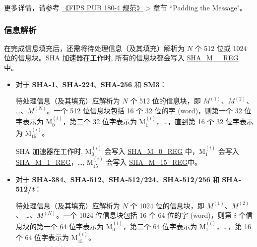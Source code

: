 \documentclass[main\_\_CN.tex]{subfiles}
\begin{document}
更多详情，请参考 \href{https://doi.org/10.6028/NIST.FIPS.180-4}{《FIPS PUB 180-4 规范》} > 章节 ``Padding the Message"。

\subsubsection{信息解析}\label{sec:sha-parsing-message}

在完成信息填充后，还需将待处理信息（及其填充）解析为 \begin{math}N\end{math} 个 512 位或 1024 位的信息块。SHA 加速器在工作时, 所有的信息块都会写入 \hyperref[regdesc:SHAMNREG]{SHA\_M\_\_REG} 中。

\begin{itemize}
    \item 对于 \textbf{SHA-1}、\textbf{SHA-224}、\textbf{SHA-256} 和 \textbf{SM3}：
    
    待处理信息（及其填充）应解析为 \begin{math}N\end{math} 个 512 位的信息块，即 \begin{math}M^{(1)}\end{math}、\begin{math}M^{(2)}\end{math}、 \dots、\begin{math}M^{(N)}\end{math}。一个 512 位信息块包括 16 个 32 位的字 (word)，则第一个 32 位字表示为 M$^{(i)}_{0}$，第二个 32 位字表示为 M$^{(i)}_{1}$，\dots，直到第 16 个 32 位字表示为 M$^{(i)}_{15}$。

    SHA 加速器在工作时, M$^{(i)}_{0}$ 会写入 \hyperref[regdesc:SHAMNREG]{SHA\_M\_0\_REG} 中，M$^{(i)}_1$ 会写入 \hyperref[regdesc:SHAMNREG]{SHA\_M\_1\_REG}，\dots, M$^{(i)}_{15}$ 会写入 \hyperref[regdesc:SHAMNREG]{SHA\_M\_15\_REG}中。
    
    \item 对于 \textbf{SHA-384}、\textbf{SHA-512}、\textbf{SHA-512/224}、\textbf{SHA-512/256} 和 \textbf{SHA-512/{\it{t}}}：
    
    待处理信息（及其填充）应解析为 \begin{math}N\end{math} 个 1024 位的信息块，即 \begin{math}M^{(1)}\end{math}、\begin{math}M^{(2)}\end{math}、 \dots、\begin{math}M^{(N)}\end{math}。一个 1024 位信息块包括 16 个 64 位的字 (word)，则第 \begin{math}i\end{math} 个信息块的第一个 64 位字表示为 M$^{(i)}_{0}$，第二个 64 位字表示为 M$^{(i)}_{1}$，\dots，第 16 个 64 位字表示为 M$^{(i)}_{15}$。


\end{itemize}
\end{document}
